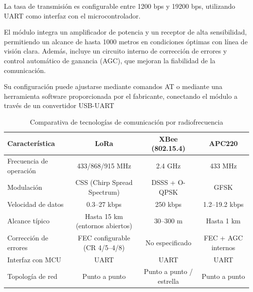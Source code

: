 \begin{itemize}
    La tasa de transmisión es configurable entre 1200 bps y 19200 bps, utilizando UART como interfaz con el microcontrolador.

    El módulo integra un amplificador de potencia y un receptor de alta sensibilidad, permitiendo un alcance de hasta 1000 metros en condiciones óptimas con línea de visión clara.
    Además, incluye un circuito interno de corrección de errores y control automático de ganancia (AGC), que mejoran la fiabilidad de la comunicación.

    Su configuración puede ajustarse mediante comandos AT o mediante una herramienta software proporcionada por el fabricante, conectando el módulo a través de un convertidor USB-UART
\end{itemize}
\begin{table}[h]
    \centering
    \footnotesize
    \begin{tabular}{|l|c|c|c|}
        \hline
        \textbf{Característica} & \textbf{LoRa}                   & \textbf{XBee (802.15.4)} & \textbf{APC220}    \\
        \hline
        Frecuencia de operación & 433/868/915 MHz                 & 2.4 GHz                  & 433 MHz            \\
        \hline
        Modulación              & CSS (Chirp Spread Spectrum)     & DSSS + O-QPSK            & GFSK               \\
        \hline
        Velocidad de datos      & 0.3–27 kbps                     & 250 kbps                 & 1.2–19.2 kbps      \\
        \hline
        Alcance típico          & Hasta 15 km (entornos abiertos) & 30–300 m                 & Hasta 1 km         \\
        \hline
        Corrección de errores   & FEC configurable (CR 4/5–4/8)   & No especificado          & FEC + AGC internos \\
        \hline
        Interfaz con MCU        & UART                            & UART                     & UART               \\
        \hline
        Topología de red        & Punto a punto                   & Punto a punto / estrella & Punto a punto      \\
        \hline
    \end{tabular}
    \caption{Comparativa de tecnologías de comunicación por radiofrecuencia}
    \label{tab:comparativa_rf}
\end{table}


